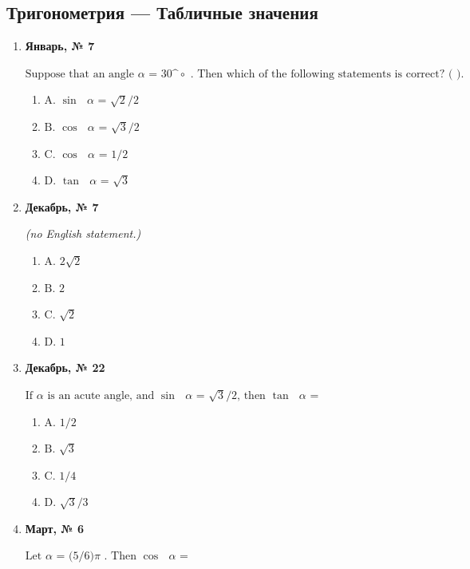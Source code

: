 \subsection*{Тригонометрия — Табличные значения}
\begin{enumerate}
\item \textbf{Январь, № 7} \par \smallskip
$\displaystyle \text{Suppose that an angle }\alpha\text{  = 30^}\circ\text{ . Then which of the following statements is correct? ( ).}$
\begin{enumerate}
\item $\displaystyle \text{A. }\sin\text{ }\alpha\text{  = }\sqrt{2}\text{/2}$
\item $\displaystyle \text{B. }\cos\text{ }\alpha\text{  = }\sqrt{3}\text{/2}$
\item $\displaystyle \text{C. }\cos\text{ }\alpha\text{  = 1/2}$
\item $\displaystyle \text{D. }\tan\text{ }\alpha\text{  = }\sqrt{3}$
\end{enumerate}
\item \textbf{Декабрь, № 7} \par \smallskip
\textit{(no English statement.)}
\begin{enumerate}
\item $\displaystyle \text{A. 2}\sqrt{2}$
\item $\displaystyle \text{B. 2}$
\item $\displaystyle \text{C. }\sqrt{2}$
\item $\displaystyle \text{D. 1}$
\end{enumerate}
\item \textbf{Декабрь, № 22} \par \smallskip
$\displaystyle \text{If }\alpha\text{  is an acute angle, and }\sin\text{ }\alpha\text{  = }\sqrt{3}\text{/2, then }\tan\text{ }\alpha\text{  =}$
\begin{enumerate}
\item $\displaystyle \text{A. 1/2}$
\item $\displaystyle \text{B. }\sqrt{3}$
\item $\displaystyle \text{C. 1/4}$
\item $\displaystyle \text{D. }\sqrt{3}\text{/3}$
\end{enumerate}
\item \textbf{Март, № 6} \par \smallskip
$\displaystyle \text{Let }\alpha\text{  = (5/6)}\pi\text{ . Then }\cos\text{ }\alpha\text{  =}$

\end{enumerate}
